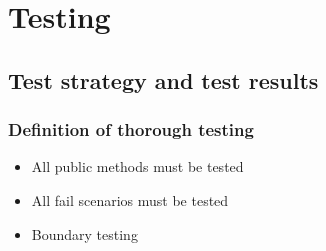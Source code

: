 \section{Testing}
\subsection{Test strategy and test results}
\subsubsection{Definition of thorough testing}
\begin{itemize}
  \item All public methods must be tested
  \item All fail scenarios must be tested
  \item Boundary testing
\end{itemize}
\newpage
